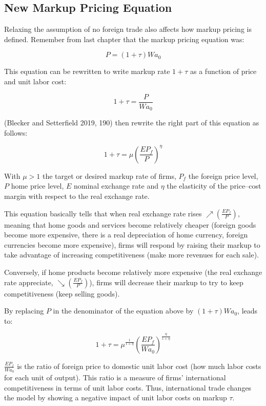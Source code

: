 \documentclass[
  letterpaper,
  DIV=11,
  numbers=noendperiod]{scrreprt}
\begin{document}
\hypertarget{new-markup-pricing-equation}{%
\subsection{New Markup Pricing
Equation}\label{new-markup-pricing-equation}}

Relaxing the assumption of no foreign trade also affects how markup
pricing is defined. Remember from last chapter that the markup pricing
equation was:

\[P = (1+\tau)Wa_0\]

This equation can be rewritten to write markup rate \(1+\tau\) as a
function of price and unit labor cost:

\[1+\tau=\frac{P}{Wa_0}\]

(Blecker and Setterfield 2019, 190) then rewrite the right part of this
equation as follows:

\[1+\tau=\mu\left(\frac{EP_f}{P}\right)^\eta\]

With \(\mu>1\) the target or desired markup rate of firms, \(P_f\) the
foreign price level, \(P\) home price level, \(E\) nominal exchange rate
and \(\eta\) the elasticity of the price--cost margin with respect to
the real exchange rate.

This equation basically tells that when real exchange rate rises
\(\nearrow \left(\frac{EP_f}{P}\right)\), meaning that home goods and
services become relatively cheaper (foreign goods become more expensive,
there is a real depreciation of home currency, foreign currencies become
more expensive), firms will respond by raising their markup to take
advantage of increasing competitiveness (make more revenues for each
sale).

Conversely, if home products become relatively more expensive (the real
exchange rate appreciate, \(\searrow \left(\frac{EP_f}{P}\right)\)),
firms will decrease their markup to try to keep competitiveness (keep
selling goods).

By replacing \(P\) in the denominator of the equation above by
\((1+\tau)Wa_0\), leads to:

\[1+\tau=\mu^{\frac{1}{1+\eta}}\left(\frac{EP_f}{Wa_0}\right)^{\frac{\eta}{1+\eta}}\]

\(\frac{EP_f}{Wa_0}\) is the ratio of foreign price to domestic unit
labor cost (how much labor costs for each unit of output). This ratio is
a measure of firms' international competitiveness in terms of unit labor
costs. Thus, international trade changes the model by showing a negative
impact of unit labor costs on markup \(\tau\).
\end{document}
